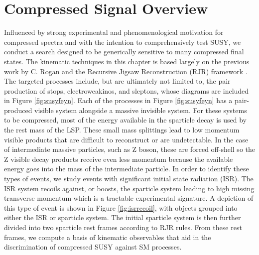 \section{Compressed Signal Overview}
Influenced by strong experimental and phenomenological motivation for compressed spectra and with the intention to comprehensively test SUSY, we conduct a search designed to be generically sensitive to many compressed final states. The kinematic techniques in this chapter is based largely on the previous work by C. Rogan and the Recursive Jigsaw Reconstruction (RJR) framework \cite{AN}\cite{PhysRevD.96.112007}. The targeted processes include, but are ultimately not limited to, the pair production of stops, electroweakinos, and sleptons, whose diagrams are included in Figure \ref{fig:susyfeyn}.  
Each of the processes in Figure \ref{fig:susyfeyn} has a pair-produced visible system alongside a massive invisible system. For these systems to be compressed, most of the energy available in the sparticle decay is used by the rest mass of the LSP. These small mass splittings lead to low momentum visible products that are difficult to reconstruct or are undetectable. In the case of intermediate massive particles, such as Z boson, these are forced off-shell so the Z visible decay products receive even less momentum because the available energy goes into the mass of the intermediate particle. In order to identify these types of events, we study events with significant initial state radiation (ISR). The ISR system recoils against, or boosts, the sparticle system leading to high missing transverse momentum which is a tractable experimental signature. A depiction of this type of event is shown in Figure \ref{fig:isrrecoil}, with objects grouped into either the ISR or sparticle system. The initial sparticle system is then further divided into two sparticle rest frames according to RJR rules. From these rest frames, we compute a basis of kinematic observables that aid in the discrimination of compressed SUSY against SM processes.

